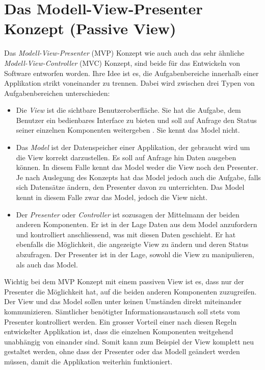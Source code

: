 \documentclass[a4paper,11pt]{report}
\begin{document}
		\section{Das Modell-View-Presenter Konzept (Passive View)} \label{mvp}
		Das \emph{Modell-View-Presenter} (MVP) Konzept wie auch auch das sehr ähnliche \emph{Modell-View-Controller} (MVC) Konzept, sind beide für das Entwickeln von Software entworfen worden. Ihre Idee ist es, die Aufgabenbereiche innerhalb einer Applikation strikt voneinander zu trennen. Dabei wird zwischen drei Typen von Aufgabenbereichen unterschieden:
		\begin{itemize}
			\item Die \emph{View} ist die sichtbare Benutzeroberfläche. Sie hat die Aufgabe, dem Benutzer ein bedienbares Interface zu bieten und soll auf Anfrage den Status seiner einzelnen Komponenten weitergeben . Sie kennt das Model nicht.
			\item Das \emph{Model} ist der Datenspeicher einer Applikation, der gebraucht wird um die View korrekt darzustellen. Es soll auf Anfrage hin Daten ausgeben können. In diesem Falle kennt das Model weder die View noch den Presenter. Je nach Auslegung des Konzepts hat das Model jedoch auch die Aufgabe, falls sich Datensätze ändern, den Presenter davon zu unterrichten. Das Model kennt in diesem Falle zwar das Model, jedoch die View nicht.
			\item Der \emph{Presenter} oder \emph{Controller} ist sozusagen der Mittelmann der beiden anderen Komponenten. Er ist in der Lage Daten aus dem Model anzufordern und kontrolliert anschliessend, was mit diesen Daten geschieht. Er hat ebenfalls die Möglichkeit, die angezeigte View zu ändern und deren Status abzufragen. Der Presenter ist in der Lage, sowohl die View zu manipulieren, als auch das Model.
		\end{itemize}
		Wichtig bei dem MVP Konzept mit einem passiven View ist es, dass nur der Presenter die Möglichkeit hat, auf die beiden anderen Komponenten zuzugreifen. Der View und das Model sollen unter keinen Umständen direkt miteinander kommunizieren. Sämtlicher benötigter Informationsaustausch soll stets vom Presenter kontrolliert werden.\cite{mvp} Ein grosser Vorteil einer nach diesen Regeln entwickelter Applikation ist, dass die einzelnen Komponenten weitgehend unabhängig von einander sind. Somit kann zum Beispiel der View komplett neu gestaltet werden, ohne dass der Presenter oder das Modell geändert werden müssen, damit die Applikation weiterhin funktioniert.
		
\end{document}
